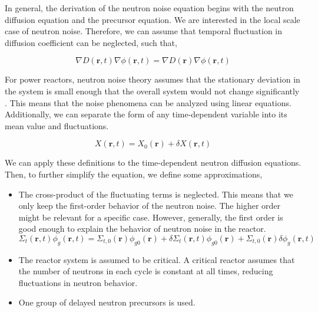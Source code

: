 In general, the derivation of the neutron noise equation begins with the neutron diffusion equation and the precursor equation. We are interested in the local scale case of neutron noise. Therefore, we can assume that temporal fluctuation in diffusion coefficient can be neglected, such that,

\begin{equation}
        \nabla D(\textbf{r}, t) \nabla \phi(\textbf{r}, t) = \nabla D(\textbf{r}) \nabla \phi(\textbf{r}, t)
\end{equation}

For power reactors, neutron noise theory assumes that the stationary deviation in the system is small enough that the overall system would not change significantly \cite{pazsitNoiseTechniquesNuclear2010}. This means that the noise phenomena can be analyzed using linear equations. Additionally, we can separate the form of any time-dependent variable into its mean value and fluctuations.

\begin{equation}
        X(\textbf{r}, t) = X_0 (\textbf{r}) + \delta X(\textbf{r}, t)
        \label{eq:fluctuation}
\end{equation}

We can apply these definitions to the time-dependent neutron diffusion equations. Then, to further simplify the equation, we define some approximations,
\begin{itemize}
        \item The cross-product of the fluctuating terms is neglected. This means that we only keep the first-order behavior of the neutron noise. The higher order might be relevant for a specific case. However, generally, the first order is good enough to explain the behavior of neutron noise in the reactor.
        \begin{equation}
                \Sigma_t (\textbf{r}, t) \phi_g (\textbf{r}, t) = \Sigma_{t,0} (\textbf{r}) \phi_{g0} (\textbf{r}) + \delta \Sigma_t (\textbf{r}, t) \phi_{g0} (\textbf{r}) + \Sigma_{t,0} (\textbf{r}) \delta \phi_g (\textbf{r}, t)
        \end{equation}


        \item The reactor system is assumed to be critical. A critical reactor assumes that the number of neutrons in each cycle is constant at all times, reducing fluctuations in neutron behavior. 
	\item One group of delayed neutron precursors is used. 
\end{itemize}

